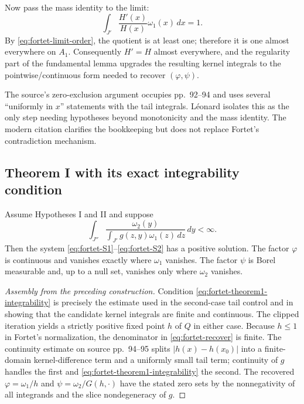 Now pass the mass identity to the limit:
\[
  \int_{J'}\frac{H'(x)}{H(x)}\omega_1(x)\,dx=1.
\]
By \eqref{eq:fortet-limit-order}, the quotient is at least one; therefore it
is one almost everywhere on $A_1$.  Consequently $H'=H$ almost everywhere,
and the regularity part of the fundamental lemma upgrades the resulting
kernel integrals to the pointwise/continuous form needed to recover
$(\varphi,\psi)$.

\begin{remark}
The source's zero-exclusion argument occupies pp.~92--94 and uses several
``uniformly in $x$'' statements with the tail integrals.  L\'eonard
\cite[Lemmas 5.10--5.12 and Theorem 5.6]{Leonard2019} isolates this as the
only step needing hypotheses beyond monotonicity and the mass identity.  The
modern citation clarifies the bookkeeping but does not replace Fortet's
contradiction mechanism.
\end{remark}

\subsection{Theorem I with its exact integrability condition}
\begin{theorem}
Assume Hypotheses I and II and suppose
\begin{equation}
  \int_{J''}
  \frac{\omega_2(y)}{\displaystyle\int_{J'}g(z,y)\omega_1(z)\,dz}
  \,dy<\infty. \tag{T1}\label{eq:fortet-theorem1-integrability}
\end{equation}
Then the system \eqref{eq:fortet-S1}--\eqref{eq:fortet-S2} has a positive
solution.  The factor $\varphi$ is continuous and vanishes exactly where
$\omega_1$ vanishes.  The factor $\psi$ is Borel measurable and, up to a
null set, vanishes only where $\omega_2$ vanishes.
\end{theorem}

\begin{proof}[Assembly from the preceding construction]
Condition \eqref{eq:fortet-theorem1-integrability} is precisely the estimate
used in the second-case tail control and in showing that the candidate kernel
integrals are finite and continuous.  The clipped iteration yields a strictly
positive fixed point $h$ of $Q$ in either case.  Because $h\le1$ in Fortet's
normalization, the denominator in \eqref{eq:fortet-recover} is finite.  The
continuity estimate on source pp.~94--95 splits
$|h(x)-h(x_0)|$ into a finite-domain kernel-difference term and a uniformly
small tail term; continuity of $g$ handles the first and
\eqref{eq:fortet-theorem1-integrability} the second.  The recovered
$\varphi=\omega_1/h$ and $\psi=\omega_2/G(h,\cdot)$ have the stated zero sets
by the nonnegativity of all integrands and the slice nondegeneracy of $g$.
\end{proof}

